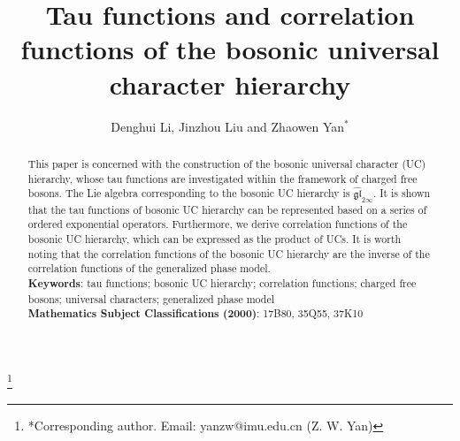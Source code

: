 \documentclass[11pt,reqno]{amsart}
\numberwithin{equation}{section}
\begin{document}
\title{Tau functions and correlation functions of the bosonic universal character hierarchy }

\author{Denghui Li, Jinzhou Liu and  Zhaowen Yan$^*$}



\thanks{*Corresponding author. Email: yanzw@imu.edu.cn (Z. W. Yan)}

\begin{abstract}
This paper is concerned with the construction of the bosonic universal character (UC) hierarchy, whose tau functions are investigated within the framework of charged free bosons. The Lie algebra corresponding to the bosonic UC hierarchy is  $\mathfrak{\widehat{gl}}_{2\infty}$. It is shown that the tau functions of bosonic UC hierarchy can be represented based on a series of ordered exponential operators. Furthermore, we derive correlation functions of the bosonic UC hierarchy, which can be expressed as the product of UCs. It is worth noting that the correlation functions of the bosonic UC hierarchy are the inverse of the correlation functions of the generalized phase model.\\
\textbf{Keywords}: tau functions; bosonic UC hierarchy; correlation functions; charged free bosons; universal characters; generalized phase model\\
\textbf{ Mathematics Subject Classifications (2000)}: 17B80, 35Q55, 37K10
\end{abstract}
\maketitle
\tableofcontents
\end{document}
